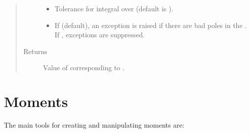 \documentclass[letterpaper,10pt,english]{sphinxmanual}
\begin{document}
\begin{fulllineitems}
\begin{quote}
\begin{description}
\begin{itemize}
\item {} 
 \textendash{} Tolerance for integral over  (default is ).

\item {} 
 \textendash{} If  (default), an exception is raised if there
are bad poles in the . If , exceptions are
suppressed.

\end{itemize}

\item[{Returns}] \leavevmode
Value of  corresponding to .

\end{description}\end{quote}

\end{fulllineitems}



\section{Moments}
\label{\detokenize{g2tools:moments}}
The main tools for creating and manipulating moments are:
\end{document}
